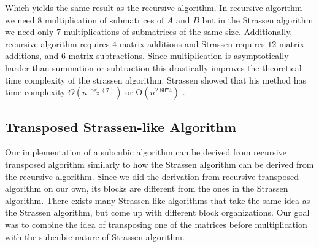 \documentclass[a4paper,11pt]{article}
\begin{document}
Which yields the same result as the recursive algorithm.
In recursive algorithm we need $8$ multiplication of submatrices of $A$ and $B$ but in the Strassen algorithm we need only $7$ multiplications of submatrices of the same size. Additionally, recursive algorithm requires $4$ matrix additions and Strassen requires $12$ matrix additions, and $6$ matrix subtractions. Since multiplication is asymptotically harder than summation or subtraction this drastically improves the theoretical time complexity of the strassen algorithm. Strassen showed that his method has time complexity
$\Theta(n^{\log_{2}(7)})$ or $\textrm{O}(n^{2.8074})$ \cite{Pan1978a}. 






\subsection{Transposed Strassen-like Algorithm}

Our implementation of a subcubic algorithm can be derived from recursive transposed algorithm similarly to how the Strassen algorithm can be derived from the recursive algorithm. 
Since we did the derivation from recursive transposed algorithm on our own, its blocks are different from the ones in the Strassen algorithm. There exists many Strassen-like algorithms that take the same idea as the Strassen algorithm, but come up with different block organizations. Our goal was to combine the idea of transposing one of the matrices before multiplication with the subcubic nature of Strassen algorithm.
\end{document}
